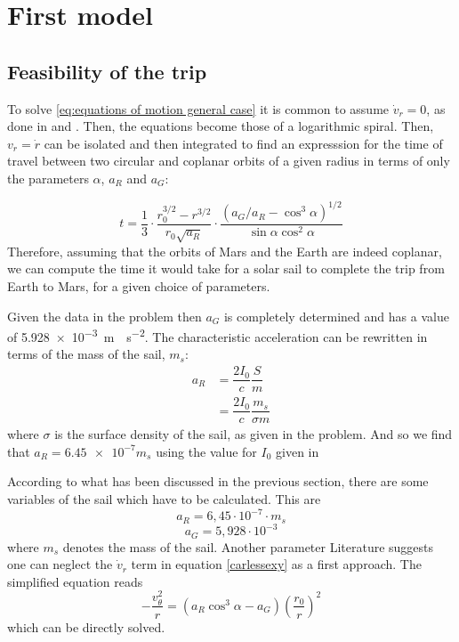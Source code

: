 \documentclass[twocolumn,12pt,a4paper]{article}
\numberwithin{equation}{section}
\begin{document}
\section{First model}
\subsection{Feasibility of the trip}
To solve \autoref{eq:equations of motion general case} it is common to assume \( \dot{v}_r = 0\), as done in \cite{tsu} and \cite{mcinnes}. Then, the equations become those of a logarithmic spiral. Then, \( v_r = \dot{r} \) can be isolated and then integrated to find an expresssion for the time of travel between two circular and coplanar orbits of a given radius in terms of only the parameters \( \alpha \), \( a_R \) and \( a_G \):

\begin{equation} \label{eq:time of flight between orbits}
	t=\frac{1}{3}\cdot\frac{r_0^{3/2}-r^{3/2}}{r_0\sqrt{a_R}}\cdot\frac{(a_G/a_R-\cos^3\alpha)^{1/2}}{\sin\alpha\cos^2\alpha}
\end{equation}
Therefore, assuming that the orbits of Mars and the Earth are indeed coplanar, we can compute the time it would take for a solar sail to complete the trip from Earth to Mars, for a given choice of parameters. 

Given the data in the problem then \( a_G \) is completely determined and has a value of \SI{5,928e-3}{m \cdot s^{-2}}. The characteristic acceleration can be rewritten in terms of the mass of the sail, \( m_s \):
\begin{align*}
  a_R &= \dfrac{2I_0}{c} \dfrac{S}{m} \\
  		&= \dfrac{2I_0}{c} \dfrac{m_s}{\sigma m}
\end{align*}
where \( \sigma \) is the surface density of the sail, as given in the problem. And so we find that \( a_R = \num{6,45e-7} m_s \) using the value for \( I_0 \) given in \cite{hollerman}


According to what has been discussed in the previous section, there are some variables of the sail which have to be calculated. This are
\[
a_R=6,45\cdot 10^{-7} \cdot m_s
\]
\[a_G=5,928\cdot 10^{-3}
\]
where $m_s$ denotes the mass of the sail.
Another parameter
Literature suggests \cite{tsu} one can neglect the  $\dot{v}_r$ term in equation \ref{carlessexy} as a first approach. The simplified equation reads
\begin{equation}
- \dfrac{v_{\theta}^2}{r} = (a_R \cos^3{\alpha} - a_G) \left(\dfrac{r_0}{r}\right)^2
\end{equation} 
which can be directly solved.
\end{document}

